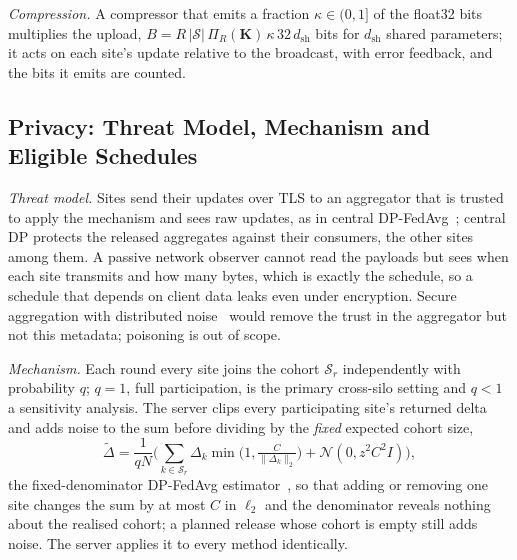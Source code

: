 \emph{Compression.} A compressor that emits a fraction $\kappa\in(0,1]$ of the float32 bits multiplies the upload, $B=R\,|\mathcal S|\,\Pi_R(\mathbf K)\,\kappa\,32\,d_{\mathrm{sh}}$ bits for $d_{\mathrm{sh}}$ shared parameters; it acts on each site's update relative to the broadcast, with error feedback, and the bits it emits are counted.

\subsection{Privacy: Threat Model, Mechanism and Eligible Schedules}
\label{sec:method-privacy}
\emph{Threat model.} Sites send their updates over TLS to an aggregator that is trusted to apply the mechanism and sees raw updates, as in central DP-FedAvg~\cite{mcmahan2018dp}; central DP protects the released aggregates against their consumers, the other sites among them. A passive network observer cannot read the payloads but sees when each site transmits and how many bytes, which is exactly the schedule, so a schedule that depends on client data leaks even under encryption. Secure aggregation with distributed noise~\cite{kairouz2021ddg} would remove the trust in the aggregator but not this metadata; poisoning is out of scope.

\emph{Mechanism.} Each round every site joins the cohort $\mathcal S_r$ independently with probability $q$; $q=1$, full participation, is the primary cross-silo setting and $q<1$ a sensitivity analysis. The server clips every participating site's returned delta and adds noise to the sum before dividing by the \emph{fixed} expected cohort size,
\begin{equation}
\tilde\Delta=\frac1{qN}\Big(\sum_{k\in\mathcal S_r}\Delta_k\min\big(1,\tfrac{C}{\|\Delta_k\|_2}\big)+\mathcal N(0,z^2C^2I)\Big),
\label{eq:dp}
\end{equation}
the fixed-denominator DP-FedAvg estimator~\cite{mcmahan2018dp}, so that adding or removing one site changes the sum by at most $C$ in $\ell_2$ and the denominator reveals nothing about the realised cohort; a planned release whose cohort is empty still adds noise. The server applies it to every method identically.

